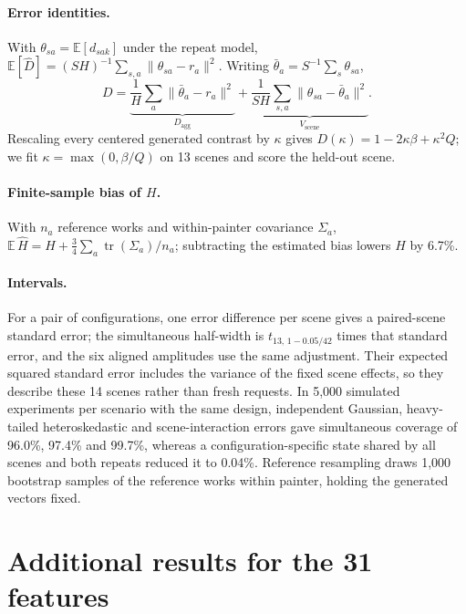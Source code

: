 \paragraph{Error identities.} With $\theta_{sa}=\mathbb E[d_{sak}]$ under the repeat model,
$\mathbb E[\widehat D]=(SH)^{-1}\sum_{s,a}\|\theta_{sa}-r_a\|^2$. Writing
$\bar\theta_a=S^{-1}\sum_s\theta_{sa}$,
\begin{equation}
D=\underbrace{\frac1H\sum_a\|\bar\theta_a-r_a\|^2}_{D_{\mathrm{agg}}}
+\underbrace{\frac{1}{SH}\sum_{s,a}\|\theta_{sa}-\bar\theta_a\|^2}_{V_{\mathrm{scene}}}.
\end{equation}
Rescaling every centered generated contrast by $\kappa$ gives $D(\kappa)=1-2\kappa\beta+\kappa^2Q$;
we fit $\kappa=\max(0,\beta/Q)$ on 13 scenes and score the held-out scene.

\paragraph{Finite-sample bias of $H$.} With $n_a$ reference works and within-painter covariance
$\Sigma_a$, $\mathbb E\,\widehat H=H+\frac34\sum_a\operatorname{tr}(\Sigma_a)/n_a$; subtracting
the estimated bias lowers $H$ by 6.7\%.

\paragraph{Intervals.} For a pair of configurations, one error difference per scene gives a
paired-scene standard error; the simultaneous half-width is $t_{13,\,1-0.05/42}$ times that
standard error, and the six aligned amplitudes use the same adjustment. Their expected squared
standard error includes the variance of the fixed scene effects, so they describe these 14
scenes rather than fresh requests. In 5,000 simulated experiments per scenario with the same
design, independent Gaussian, heavy-tailed heteroskedastic and scene-interaction errors gave
simultaneous coverage of 96.0\%, 97.4\% and 99.7\%, whereas a configuration-specific state
shared by all scenes and both repeats reduced it to 0.04\%. Reference resampling draws 1,000
bootstrap samples of the reference works within painter, holding the generated vectors fixed.

\FloatBarrier
\section{Additional results for the 31 features}\label{app:hand}

